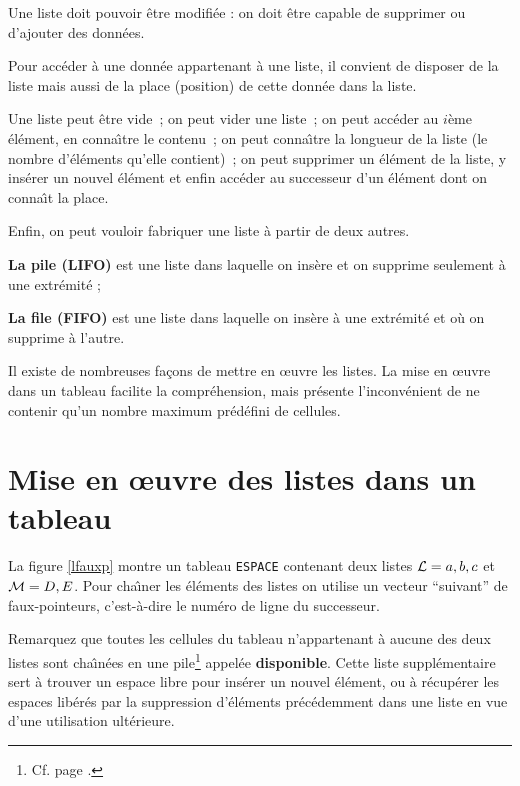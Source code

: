 \begin{multicols}{2}
  Une liste doit pouvoir \^etre modifi\'ee :  on doit \^etre capable de supprimer ou
  d'ajouter des donn\'ees.
  
  
  Pour acc\'eder \`a une donn\'ee appartenant \`a une liste, il convient de
  disposer de la liste mais aussi de la place (position) de cette donn\'ee dans la
  liste.
  
  Une liste peut \^etre vide~;  on peut 
  vider une liste~; on peut acc\'eder au $i$\`eme \'el\'ement, en conna\^\i tre
  le contenu~; on
  peut conna\^\i tre la longueur de la liste (le nombre d'\'el\'ements qu'elle
  contient)~; on peut supprimer un \'el\'ement de la liste, y ins\'erer un
  nouvel \'el\'ement et enfin acc\'eder au successeur d'un \'el\'ement dont on
  conna\^\i t la place.
  
  Enfin, on peut vouloir fabriquer une liste \`a partir de deux
  autres.
  
      
{\bf La pile  (LIFO)} est une liste dans laquelle on ins\`ere et on supprime
seulement \`a une extr\'emit\'e ; 

{\bf  La file  (FIFO)} est une liste dans laquelle on ins\`ere \`a une extr\'emit\'e
et o\`u on supprime \`a l'autre.

Il existe de nombreuses fa\c cons de mettre en \oe uvre les listes. La mise en
\oe uvre dans un tableau facilite la compr\'ehension, mais pr\'esente
l'inconv\'enient de ne contenir qu'un nombre maximum pr\'ed\'efini de cellules.
      
\section*{Mise en \oe uvre des listes  dans un tableau}

      La figure \ref{lfauxp} montre un tableau {\tt ESPACE}
    contenant deux listes ${\cal L} = a, b, c$ et ${\cal M} = D, E$.
    Pour cha\^\i ner les \'el\'ements des listes on utilise un vecteur ``suivant'' 
    de faux-pointeurs, c'est-\`a-dire le num\'ero de ligne du successeur.

	Remarquez que toutes les cellules du tableau n'appartenant \`a
    aucune des deux listes sont cha\^\i n\'ees en une pile\footnote{Cf. page
	\pageref{Pile}.} appel\'ee {\bf disponible}.
	Cette liste suppl\'ementaire sert \`a trouver un espace libre pour ins\'erer
    un nouvel \'e\-l\'e\-ment,
	ou \`a r\'ecup\'erer les espaces lib\'er\'es par la
    suppression d'\'el\'ements pr\'ec\'e\-dem\-ment dans une liste en vue d'une
    utilisation ult\'erieure.


\end{multicols}
